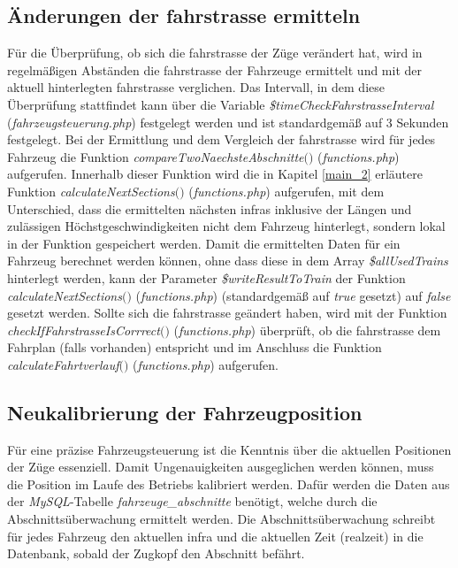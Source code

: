 \subsection{Änderungen der \Gls{fahrstrasse} ermitteln}
Für die Überprüfung, ob sich die \Gls{fahrstrasse} der Züge verändert hat, wird in regelmäßigen Abständen die \Gls{fahrstrasse} der Fahrzeuge ermittelt und mit der aktuell hinterlegten \Gls{fahrstrasse} verglichen. Das Intervall, in dem diese Überprüfung stattfindet kann über die Variable \textit{\$timeCheckFahrstrasseInterval} (\textit{fahrzeugsteuerung.php}) festgelegt werden und ist standardgemäß auf 3 Sekunden festgelegt. Bei der Ermittlung und dem Vergleich der \Gls{fahrstrasse} wird für jedes Fahrzeug die Funktion \textit{compare\-Two\-Naechste\-Abschnitte$($$)$} (\textit{functions.php}) aufgerufen. Innerhalb dieser Funktion wird die in Kapitel \ref{main_2} erläutere Funktion \textit{calculateNextSections$($$)$} (\textit{functions.php}) aufgerufen, mit dem Unterschied, dass die ermittelten nächsten \acp{infra} inklusive der Längen und zulässigen Höchstgeschwindigkeiten nicht dem Fahrzeug hinterlegt, sondern lokal in der Funktion gespeichert werden. Damit die ermittelten Daten für ein Fahrzeug berechnet werden können, ohne dass diese in dem Array \textit{\$allUsedTrains} hinterlegt werden, kann der Parameter \textit{\$writeResultToTrain} der Funktion \textit{calculateNextSections$($$)$} (\textit{functions.php}) (standardgemäß auf \textit{true} gesetzt) auf \textit{false} gesetzt werden. Sollte sich die \Gls{fahrstrasse} geändert haben, wird mit der Funktion \textit{check\-If\-Fahr\-strasse\-Is\-Corrrect$($$)$} (\textit{functions.php}) überprüft, ob die \Gls{fahrstrasse} dem Fahrplan (falls vorhanden) entspricht und im Anschluss die Funktion \textit{cal\-cu\-late\-Fahrt\-verlauf$($$)$} (\textit{functions.php}) aufgerufen.
\subsection{Neukalibrierung der Fahrzeugposition}  \label{main_5}
Für eine präzise Fahrzeugsteuerung ist die Kenntnis über die aktuellen Positionen der Züge es­sen­zi­ell. Damit Ungenauigkeiten ausgeglichen werden können, muss die Position im Laufe des Betriebs kalibriert werden. Dafür werden die Daten aus der \mbox{\textit{MySQL}}-Tabelle \textit{fahrzeuge\_abschnitte} benötigt, welche durch die Abschnittsüberwachung ermittelt werden. Die Abschnittsüberwachung schreibt für jedes Fahrzeug den aktuellen \ac{infra} und die aktuellen Zeit (\Gls{realzeit}) in die Datenbank, sobald der Zugkopf den Abschnitt befährt. 

